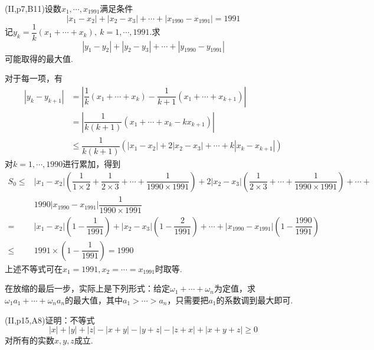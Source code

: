\documentclass[cn,hazy,black,10pt,normal]{elegantnote}
\newcommand{\ssb}[1]{\left( #1 \right)}
\begin{document}
\begin{problem}
	(II,p7,B11)设数$x_1,\cdots ,x_{1991}$满足条件$$|x_1-x_2| + |x_2-x_3| + \cdots + |x_{1990}-x_{1991}|=1991$$
	记$y_k=\dfrac{1}{k}(x_1+ \cdots +x_k),~k=1, \cdots ,1991$.求$$|y_1-y_2|+|y_2-y_3|+\cdots + |y_{1990}-y_{1991}|$$可能取得的最大值.
\end{problem}
\begin{solution}
	对于每一项，有
	\begin{align*}
		|y_k-y_{k+1}| &= \left| \dfrac{1}{k}(x_1+\cdots +x_k)-\dfrac{1}{k+1}(x_1+\cdots +x_{k+1}) \right| \\
		&= \left| \dfrac{1}{k(k+1)}(x_1+ \cdots + x_k-kx_{k+1}) \right| \\
		&\leq \dfrac{1}{k(k+1)}(|x_1-x_2|+2|x_2-x_3|+\cdots +k|x_k-x_{k+1}|)
	\end{align*}
	对$k=1, \cdots ,1990$进行累加，得到
	\begin{align*}
		S_0 \leq &|x_1-x_2|\ssb{ \dfrac{1}{1\times 2}+\dfrac{1}{2\times 3}+\cdots +\dfrac{1}{1990\times 1991} }+2|x_2-x_3|\ssb{\dfrac{1}{2\times 3}+\cdots +\dfrac{1}{1990\times 1991}} + \cdots + \\
		&1990|x_{1990}-x_{1991}|\dfrac{1}{1990 \times 1991} \\
		=& |x_1-x_2|\ssb{1-\dfrac{1}{1991}} + |x_2-x_3|\ssb{1-\dfrac{2}{1991}} + \cdots + |x_{1990}-x_{1991}|\ssb{1-\dfrac{1990}{1991}} \\
		\leq &1991 \times \ssb{1-\dfrac{1}{1991}} = 1990
	\end{align*}
	上述不等式可在$x_1=1991,x_2=\cdots =x_{1991}$时取等.
\end{solution}
\begin{remark}
	在放缩的最后一步，实际上是下列形式：给定$\omega _1+\cdots +\omega _n$为定值，求$\omega _1a_1+\cdots +\omega _na_n$的最大值，其中$a_1 > \cdots > a_n$，只需要把$a_1$的系数调到最大即可.
\end{remark}

\begin{problem}
	(II,p15,A8)证明：不等式$$|x|+|y|+|z|-|x+y|-|y+z|-|z+x|+|x+y+z| \geq 0$$
	对所有的实数$x,y,z$成立.
\end{problem}
\end{document}
